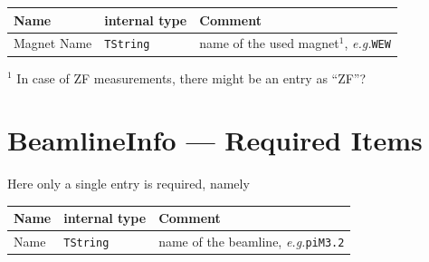 \documentclass[twoside]{article}
\newcommand{\eg}{\emph{e.g.}\xspace}
\newcommand{\tstring}{\texttt{TString}\xspace}
\begin{document}
\vspace{2mm}

\begin{tabular}{l|l|l}
Name           & internal type   & Comment \\ \hline\hline
Magnet Name    & \tstring        & name of the used magnet$^1$, \eg \texttt{WEW} \\
\end{tabular}

\vspace{2mm}

\begin{small}
\noindent $^1$ In case of ZF measurements, there might be an entry as ``ZF''?
\end{small}

\section{BeamlineInfo --- Required Items} \label{sec:BeamlineInfoRequired}

Here only a single entry is required, namely 

\vspace{2mm}

\begin{tabular}{l|l|l}
Name           & internal type   & Comment \\ \hline\hline
Name           & \tstring        & name of the beamline, \eg \texttt{piM3.2} \\
\end{tabular}
\end{document}
